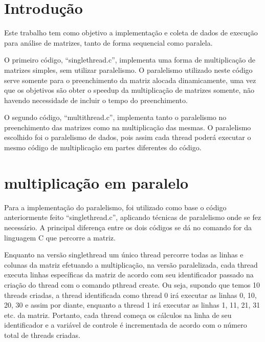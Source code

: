 \documentclass[journal, twoside]{IEEEtran}
\begin{document}
\maketitle

\IEEEpeerreviewmaketitle



\section{Introdução}

\par \quad Este trabalho tem como objetivo a implementação e coleta de dados de execução para análise de matrizes, tanto de forma sequencial como paralela.
\par \quad O primeiro código, “singlethread.c”, implementa uma forma de multiplicação de matrizes simples, sem utilizar paralelismo. O paralelismo utilizado neste código serve somente para o preenchimento da matriz alocada dinamicamente, uma vez que os objetivos são obter o speedup da multiplicação de matrizes somente, não havendo necessidade de incluir o tempo do preenchimento. 
\par \quad O segundo código, “multithread.c”, implementa tanto o paralelismo no preenchimento das matrizes como na multiplicação das mesmas. O paralelismo escolhido foi o paralelismo de dados, pois assim cada thread poderá executar o mesmo código de multiplicação em partes diferentes do código.





\section{multiplicação em paralelo}
\par \quad Para a implementação do paralelismo, foi utilizado como base o código anteriormente feito “singlethread.c”, aplicando técnicas de paralelismo onde se fez necessário. A principal diferença entre os dois códigos se dá no comando for da linguagem C que percorre a matriz. 
\par \quad Enquanto na versão singlethread um único thread percorre todas as linhas e colunas da matriz efetuando a multiplicação, na versão paralelizada, cada thread executa linhas específicas da matriz de acordo com seu identificador passado na criação do thread com o comando pthread create. Ou seja, supondo que temos 10 threads criadas, a thread identificada como thread 0 irá executar as linhas 0, 10, 20, 30 e assim por diante, enquanto a thread 1 irá executar as linhas 1, 11, 21, 31 etc. da matriz. Portanto, cada thread começa os cálculos na linha de seu identificador e a variável de controle é incrementada de acordo com o número total de threads criadas.
\end{document}
